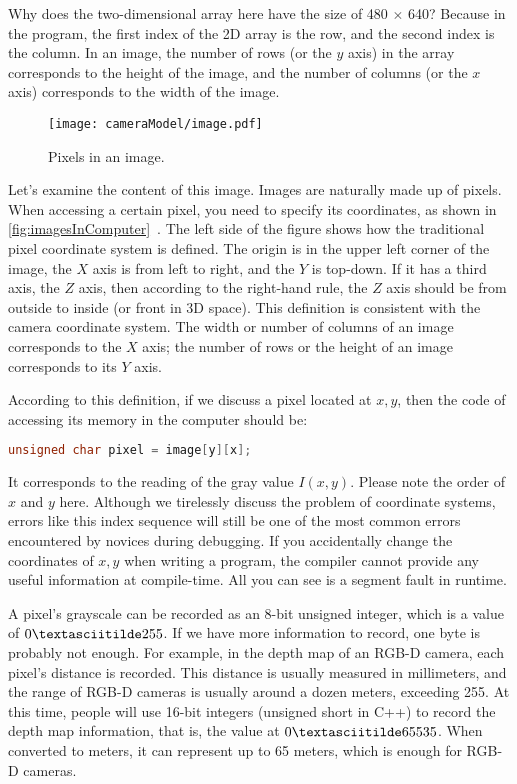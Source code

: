 Why does the two-dimensional array here have the size of 480 $ \times $ 640? Because in the program, the first index of the 2D array is the row, and the second index is the column. In an image, the number of rows (or the $y$ axis) in the array corresponds to the height of the image, and the number of columns (or the $x$ axis) corresponds to the width of the image.
\begin{figure}[!t]
    \centering
    \texttt{[image: cameraModel/image.pdf]}
    \caption{Pixels in an image.}
    \label{fig:imagesInComputer}
\end{figure}

Let's examine the content of this image. Images are naturally made up of pixels. When accessing a certain pixel, you need to specify its coordinates, as shown in \autoref{fig:imagesInComputer}~. The left side of the figure shows how the traditional pixel coordinate system is defined. The origin is in the upper left corner of the image, the $X$ axis is from left to right, and the $Y$ is top-down. If it has a third axis, the $ Z $ axis, then according to the right-hand rule, the $ Z $ axis should be from outside to inside (or front in 3D space). This definition is consistent with the camera coordinate system. The width or number of columns of an image corresponds to the $ X $ axis; the number of rows or the height of an image corresponds to its $ Y $ axis.

According to this definition, if we discuss a pixel located at $x,y$, then the code of accessing its memory in the computer should be:
\begin{lstlisting}[language = C++, caption = Accessing image pixels]
unsigned char pixel = image[y][x];
\end{lstlisting}

It corresponds to the reading of the gray value $ I(x,y) $. Please note the order of $ x $ and $ y $ here. Although we tirelessly discuss the problem of coordinate systems, errors like this index sequence will still be one of the most common errors encountered by novices during debugging. If you accidentally change the coordinates of $ x, y $ when writing a program, the compiler cannot provide any useful information at compile-time. All you can see is a segment fault in runtime.

A pixel's grayscale can be recorded as an 8-bit unsigned integer, which is a value of $0\textasciitilde 255$. If we have more information to record, one byte is probably not enough. For example, in the depth map of an RGB-D camera, each pixel's distance is recorded. This distance is usually measured in millimeters, and the range of RGB-D cameras is usually around a dozen meters, exceeding 255. At this time, people will use 16-bit integers (unsigned short in C++) to record the depth map information, that is, the value at $0 \textasciitilde 65535$. When converted to meters, it can represent up to 65 meters, which is enough for RGB-D cameras.

